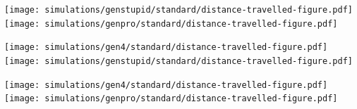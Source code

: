 \begin{minipage}[c]{\textwidth}
	\texttt{[image: simulations/genstupid/standard/distance-travelled-figure.pdf]}
	\vspace{0.5cm}
	\texttt{[image: simulations/genpro/standard/distance-travelled-figure.pdf]}
\end{minipage}

\begin{minipage}[c]{\textwidth}
	\texttt{[image: simulations/gen4/standard/distance-travelled-figure.pdf]}
	\vspace{0.5cm}
	\texttt{[image: simulations/genstupid/standard/distance-travelled-figure.pdf]}
\end{minipage}

\begin{minipage}[c]{\textwidth}
	\texttt{[image: simulations/gen4/standard/distance-travelled-figure.pdf]}
	\vspace{0.5cm}
	\texttt{[image: simulations/genpro/standard/distance-travelled-figure.pdf]}
\end{minipage}

